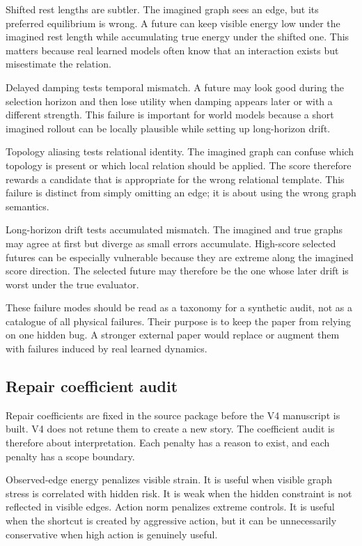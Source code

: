 \documentclass{article}
\begin{document}
Shifted rest lengths are subtler.  The imagined graph sees an edge, but its
preferred equilibrium is wrong.  A future can keep visible energy low under the
imagined rest length while accumulating true energy under the shifted one.  This
matters because real learned models often know that an interaction exists but
misestimate the relation.

Delayed damping tests temporal mismatch.  A future may look good during the
selection horizon and then lose utility when damping appears later or with a
different strength.  This failure is important for world models because a short
imagined rollout can be locally plausible while setting up long-horizon drift.

Topology aliasing tests relational identity.  The imagined graph can confuse
which topology is present or which local relation should be applied.  The score
therefore rewards a candidate that is appropriate for the wrong relational
template.  This failure is distinct from simply omitting an edge; it is about
using the wrong graph semantics.

Long-horizon drift tests accumulated mismatch.  The imagined and true graphs may
agree at first but diverge as small errors accumulate.  High-score selected
futures can be especially vulnerable because they are extreme along the imagined
score direction.  The selected future may therefore be the one whose later drift
is worst under the true evaluator.

These failure modes should be read as a taxonomy for a synthetic audit, not as
a catalogue of all physical failures.  Their purpose is to keep the paper from
relying on one hidden bug.  A stronger external paper would replace or augment
them with failures induced by real learned dynamics.

\subsection{Repair coefficient audit}

Repair coefficients are fixed in the source package before the V4 manuscript is
built.  V4 does not retune them to create a new story.  The coefficient audit is
therefore about interpretation.  Each penalty has a reason to exist, and each
penalty has a scope boundary.

Observed-edge energy penalizes visible strain.  It is useful when visible graph
stress is correlated with hidden risk.  It is weak when the hidden constraint is
not reflected in visible edges.  Action norm penalizes extreme controls.  It is
useful when the shortcut is created by aggressive action, but it can be
unnecessarily conservative when high action is genuinely useful.
\end{document}
